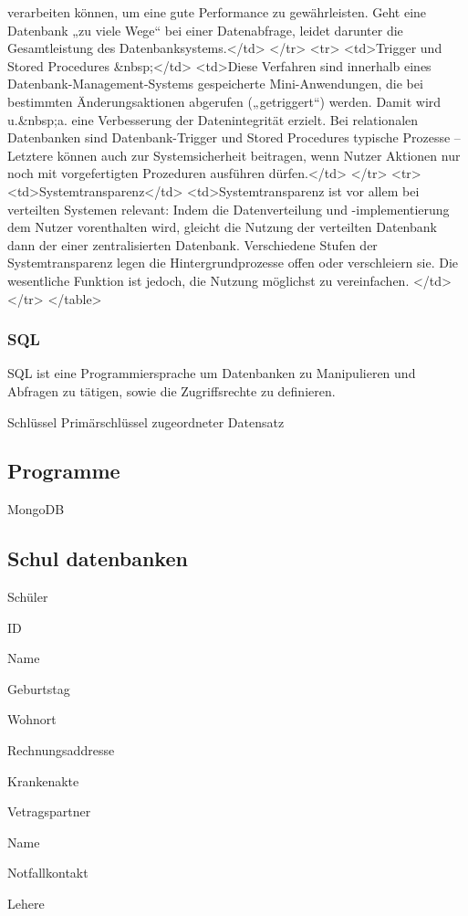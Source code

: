 verarbeiten können, um eine gute Performance zu gewährleisten. Geht eine Datenbank „zu viele Wege“ bei einer Datenabfrage, leidet darunter die Gesamtleistung des Datenbanksystems.</td> </tr> <tr> <td>Trigger und Stored Procedures &nbsp;</td> <td>Diese Verfahren sind innerhalb eines Datenbank-Management-Systems gespeicherte Mini-Anwendungen, die bei bestimmten Änderungsaktionen abgerufen („getriggert“) werden. Damit wird u.&nbsp;a. eine Verbesserung der Datenintegrität erzielt. Bei relationalen Datenbanken sind Datenbank-Trigger und Stored Procedures typische Prozesse – Letztere können auch zur Systemsicherheit beitragen, wenn Nutzer Aktionen nur noch mit vorgefertigten Prozeduren ausführen dürfen.</td> </tr> <tr> <td>Systemtransparenz</td> <td>Systemtransparenz ist vor allem bei verteilten Systemen relevant: Indem die Datenverteilung und -implementierung dem Nutzer vorenthalten wird, gleicht die Nutzung der verteilten Datenbank dann der einer zentralisierten Datenbank. Verschiedene Stufen der Systemtransparenz legen die Hintergrundprozesse offen oder verschleiern sie. Die wesentliche Funktion ist jedoch, die Nutzung möglichst zu vereinfachen. </td> </tr> 
</table>
\stopbuffer

\stopplacetable



\subsubsection{SQL}

SQL ist eine Programmiersprache um Datenbanken zu Manipulieren und Abfragen zu
tätigen, sowie die Zugriffsrechte zu definieren.

Schlüssel Primärschlüssel zugeordneter Datensatz



\subsection{Programme}

\startitemize[packed]
\item MongoDB
\startitemize[packed]
\item 
\stopitemize
\stopitemize

\subsection{Schul datenbanken}

\startitemize[packed]
\item Schüler
\startitemize[packed]
\item ID
\item Name
\item Geburtstag
\item Wohnort
\item Rechnungsaddresse
\item Krankenakte
\item Vetragspartner
\startitemize[packed]
\item Name 

\stopitemize
\item Notfallkontakt
\stopitemize
\item Lehere
\stopitemize
